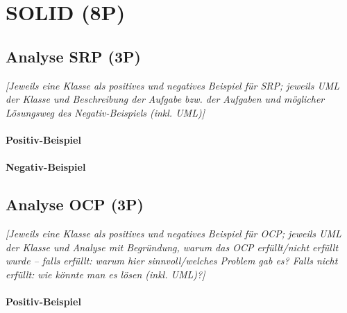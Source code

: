 
\titlespacing*{\chapter}{0pt}{-30mm}{10pt}
  
\chapter{SOLID (8P)}
\pagestyle{scrheadings}
\clearscrheadfoot
{}
\setcounter{page}{3}
\ofoot[\pagemark]{\pagemark}
\onehalfspacing

\section{Analyse SRP (3P)}
\emph{[Jeweils eine Klasse als positives und negatives Beispiel für SRP; jeweils UML der Klasse und
Beschreibung der Aufgabe bzw. der Aufgaben und möglicher Lösungsweg des Negativ-Beispiels (inkl.
UML)]}

\subsubsection{Positiv-Beispiel}
\subsubsection{Negativ-Beispiel}

\section{Analyse OCP (3P)}
\emph{[Jeweils eine Klasse als positives und negatives Beispiel für OCP; jeweils UML der Klasse und
Analyse mit Begründung, warum das OCP erfüllt/nicht erfüllt wurde – falls erfüllt: warum hier
sinnvoll/welches Problem gab es? Falls nicht erfüllt: wie könnte man es lösen (inkl. UML)?]}

\subsubsection{Positiv-Beispiel}
